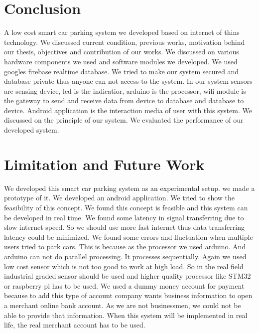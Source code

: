 \section{Conclusion}
A low cost smart car parking system we developed based on internet of thins technology. We discussed current condition, previous works, motivation behind our thesis, objectives and contribution of our works. We discussed on various hardware components we used and software modules we developed. We used googles firebase realtime database. We tried to make our system secured and database private thus anyone can not access to the system. In our system sensors are sensing device, led is the indicatior, arduino is the processor, wifi module is the gateway to send and receive data from device to database and database to device. Android application is the interaction media of user with this system. We discussed on the principle of our system. We evaluated the performance of our developed system.

\section{Limitation and Future Work}
We developed this smart car parking system as an experimental setup. we made a prototype of it. We developed an android application. We tried to show the feasibility of this concept. We found this concept is feasible and this system can be developed in real time. We found some latency in signal transferring due to slow internet speed. So we should use more fast internet thus data transferring latency could be minimized. We found some errors and fluctuation when multiple users tried to park cars. This is because as the processor we used arduino. And arduino can not do parallel processing. It processes sequentially. Again we used low cost sensor which is not too good to work at high load. So in the real field industrial graded sensor should be used and higher quality processor like STM32 or raspberry pi has to be used. We used a dummy money account for payment because to add this type of account company wants business information to open a merchant online bank account. As we are not businessmen, we could not be able to provide that information. When this system will be implemented in real life, the real merchant account has to be used. 